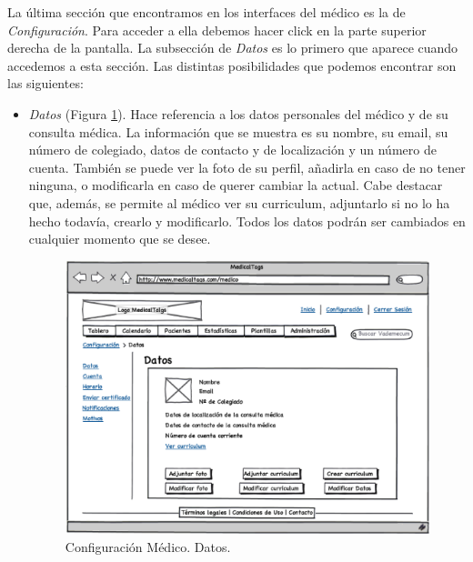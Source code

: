 \documentclass[a4paper,oneside,11pt]{book}
\begin{document}
		La última sección que encontramos en los interfaces del médico es la de \textit{Configuración}. Para acceder a ella debemos hacer click en la parte superior derecha de la pantalla. La subsección de \textit{Datos} es lo primero que aparece cuando accedemos a esta sección. Las distintas posibilidades que podemos encontrar son las siguientes:
		
		\begin{itemize}
			\item \textit{Datos} (Figura \ref{fig:configuracion_datos}). Hace referencia a los datos personales del médico y de su consulta médica. La información que se muestra es su nombre, su email, su número de colegiado, datos de contacto y de localización y un número de cuenta. También se puede ver la foto de su perfil, añadirla en caso de no tener ninguna, o modificarla en caso de querer cambiar la actual. Cabe destacar que, además, se permite al médico ver su curriculum, adjuntarlo si no lo ha hecho todavía, crearlo y modificarlo. Todos los datos podrán ser cambiados en cualquier momento que se desee.
			
			
			\begin{figure}[H]
			  \centering
			    \includegraphics[width=12cm]{img/eps/23_Configuracion_Medico.eps}
			  \caption{Configuración Médico. Datos.}
			  \label{fig:configuracion_datos}
			\end{figure}
			

\end{itemize}
\end{document}
